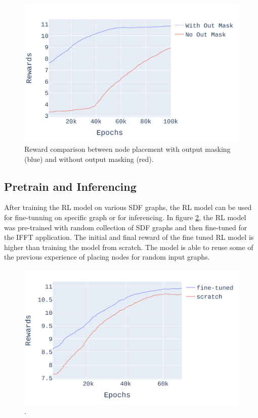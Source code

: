 \begin{figure}[h]
  \centering
  \includegraphics[width=\linewidth]{fig/ifft_masked_nomask.pdf}
  \caption{Reward comparison between node placement with output masking (blue) and without output masking (red).}
  \label{fig:mask_nomask}
\end{figure}

\subsection{Pretrain and Inferencing}

After training the RL model on various SDF graphs, the RL model can be used for fine-tunning on specific graph or for inferencing.
In figure \ref{fig:pretrain_ifft}, the RL model was pre-trained with random collection of SDF graphs and then fine-tuned for the IFFT application.
The initial and final reward of the fine tuned RL model is higher than training the model from scratch.
The model is able to reuse some of the previous experience of placing nodes for random input graphs.

\begin{figure}[h]
  \centering
  \includegraphics[width=\linewidth]{fig/pretrain_ifft.pdf}
  \caption{.}
  \label{fig:pretrain_ifft}
\end{figure}
